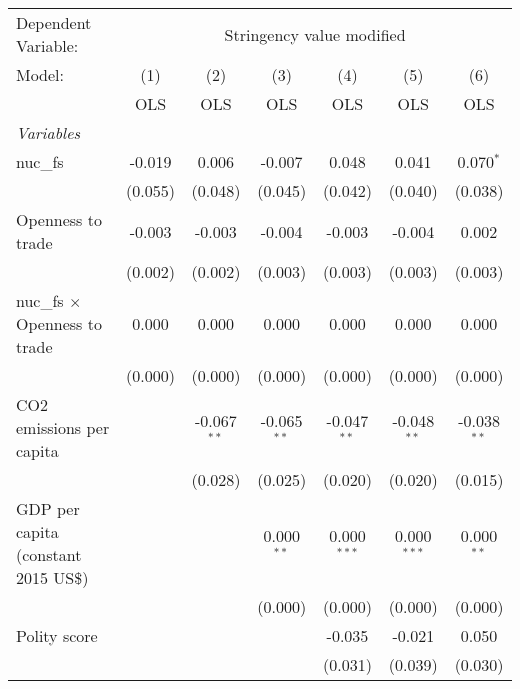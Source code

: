 
\begingroup
\centering
\begin{tabular}{lcccccc}
   \toprule
   Dependent Variable: & \multicolumn{6}{c}{Stringency value modified}\\
   Model:                               & (1)     & (2)           & (3)           & (4)           & (5)           & (6)\\  
                                        &  OLS    & OLS           & OLS           & OLS           & OLS           & OLS\\  
   \midrule
   \emph{Variables}\\
   nuc\_fs                              & -0.019  & 0.006         & -0.007        & 0.048         & 0.041         & 0.070$^{*}$\\   
                                        & (0.055) & (0.048)       & (0.045)       & (0.042)       & (0.040)       & (0.038)\\   
   Openness to trade                    & -0.003  & -0.003        & -0.004        & -0.003        & -0.004        & 0.002\\   
                                        & (0.002) & (0.002)       & (0.003)       & (0.003)       & (0.003)       & (0.003)\\   
   nuc\_fs $\times$ Openness to trade   & 0.000   & 0.000         & 0.000         & 0.000         & 0.000         & 0.000\\   
                                        & (0.000) & (0.000)       & (0.000)       & (0.000)       & (0.000)       & (0.000)\\   
   CO2 emissions per capita             &         & -0.067$^{**}$ & -0.065$^{**}$ & -0.047$^{**}$ & -0.048$^{**}$ & -0.038$^{**}$\\   
                                        &         & (0.028)       & (0.025)       & (0.020)       & (0.020)       & (0.015)\\   
   GDP per capita (constant 2015 US\$)  &         &               & 0.000$^{**}$  & 0.000$^{***}$ & 0.000$^{***}$ & 0.000$^{**}$\\   
                                        &         &               & (0.000)       & (0.000)       & (0.000)       & (0.000)\\   
   Polity score                         &         &               &               & -0.035        & -0.021        & 0.050\\   
                                        &         &               &               & (0.031)       & (0.039)       & (0.030)\\   

\end{tabular}
